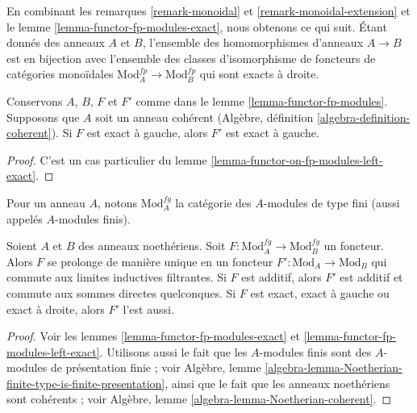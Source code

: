 \begin{remark}
\label{remark-monoidal-extension-exact}
En combinant les remarques \ref{remark-monoidal} et \ref{remark-monoidal-extension}
et le lemme \ref{lemma-functor-fp-modules-exact},
nous obtenons ce qui suit. Étant donnés des anneaux $A$ et $B$, l'ensemble des homomorphismes d'anneaux $A \to B$
est en bijection avec l'ensemble des classes d'isomorphisme
de foncteurs de catégories monoïdales $\text{Mod}^{fp}_A \to \text{Mod}^{fp}_B$
qui sont exacts à droite.
\end{remark}

\begin{lemma}
\label{lemma-functor-fp-modules-left-exact}
Conservons $A$, $B$, $F$ et $F'$ comme dans le lemme \ref{lemma-functor-fp-modules}.
Supposons que $A$ soit un anneau cohérent
(Algèbre, définition \ref{algebra-definition-coherent}).
Si $F$ est exact à gauche, alors $F'$ est exact à gauche.
\end{lemma}

\begin{proof}
C'est un cas particulier du lemme \ref{lemma-functor-on-fp-modules-left-exact}.
\end{proof}

\noindent
Pour un anneau $A$, notons $\text{Mod}^{fg}_A$ la catégorie des
$A$-modules de type fini (aussi appelés $A$-modules finis).

\begin{lemma}
\label{lemma-functor-finite-modules}
Soient $A$ et $B$ des anneaux noethériens. Soit
$F : \text{Mod}^{fg}_A \to \text{Mod}^{fg}_B$ un foncteur.
Alors $F$ se prolonge de manière unique en un foncteur $F' : \text{Mod}_A \to \text{Mod}_B$
qui commute aux limites inductives filtrantes. Si $F$ est additif, alors
$F'$ est additif et commute aux sommes directes quelconques.
Si $F$ est exact, exact à gauche ou exact à droite, alors $F'$ l'est aussi.
\end{lemma}

\begin{proof}
Voir les lemmes \ref{lemma-functor-fp-modules-exact} et
\ref{lemma-functor-fp-modules-left-exact}.
Utilisons aussi le fait que les $A$-modules finis sont des $A$-modules de présentation finie ;
voir Algèbre, lemme
\ref{algebra-lemma-Noetherian-finite-type-is-finite-presentation},
ainsi que le fait que les anneaux noethériens sont cohérents ; voir
Algèbre, lemme \ref{algebra-lemma-Noetherian-coherent}.
\end{proof}









